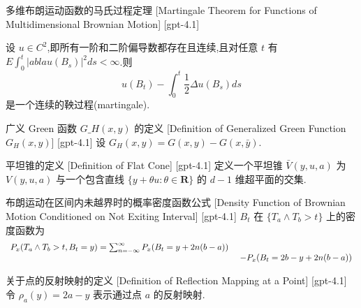 \documentclass[UTF8]{ctexart}
\begin{document}
    
    
    \begin{thm}
        {多维布朗运动函数的马氏过程定理}
        [Martingale Theorem for Functions of Multidimensional Brownian Motion]
        [gpt-4.1]
        
设 $
u \in C^{2}$,即所有一阶和二阶偏导数都存在且连续,且对任意 $t$ 有 $E\int_{0}^{t} |
abla 
u(B_{s})|^{2} ds < \infty$.则
\[
u(B_{t}) - \int_{0}^{t} \frac{1}{2} \Delta 
u(B_{s}) ds
\]
是一个连续的鞅过程(martingale).

    \end{thm}
    
    
    
    \begin{dfn}
        {广义 Green 函数 $G\_H(x, y)$ 的定义}
        [Definition of Generalized Green Function $G_H(x, y)$]
        [gpt-4.1]
        设 $G_H(x, y) = G(x, y) - G(x, \bar{y})$.
    \end{dfn}
    
    
    
    \begin{dfn}
        {平坦锥的定义}
        [Definition of Flat Cone]
        [gpt-4.1]
        定义一个平坦锥 $\bar{V}(y, 
u, a)$ 为 $V(y, 
u, a)$ 与一个包含直线 $\{y + \theta 
u : \theta \in \mathbf{R}\}$ 的 $d-1$ 维超平面的交集.
    \end{dfn}
    
    
    
    \begin{thm}
        {布朗运动在区间内未越界时的概率密度函数公式}
        [Density Function of Brownian Motion Conditioned on Not Exiting Interval]
        [gpt-4.1]
        $B_t$ 在 $\{ T_{a} \land T_{b} > t \}$ 上的密度函数为
\[
\begin{array} { l l r }
{ P _ { x } ( T _ { a } \wedge T _ { b } > t , B _ { t } = y ) = \sum _ { n = - \infty } ^ { \infty } P _ { x } ( B _ { t } = y + 2 n ( b - a ) ) } \\
& { ~ - P _ { x } ( B _ { t } = 2 b - y + 2 n ( b - a ) ) }
\end{array}
\]

    \end{thm}
    
    
    
    \begin{dfn}
        {关于点的反射映射的定义}
        [Definition of Reflection Mapping at a Point]
        [gpt-4.1]
        令 $\rho_{a}(y) = 2a - y$ 表示通过点 $a$ 的反射映射.

    \end{dfn}
    
\end{document}
